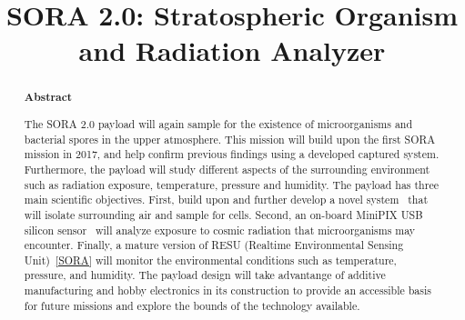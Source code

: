 \documentclass[aps,superscriptaddress,floatfix,nofootinbib,showpacs,amsmath,amssymb,altaffilletter,floatfix,onecolumn]{revtex4-1}
\begin{document}
\title{SORA 2.0: Stratospheric Organism and Radiation Analyzer}

\begin{abstract}
\begin{center}
{\bf Abstract}
\end{center}

The SORA 2.0 payload will again sample for the existence of microorganisms and bacterial spores in the upper atmosphere.  This mission will build upon the first SORA mission in 2017, and help confirm previous findings using a developed captured system. Furthermore, the payload will study different aspects of the surrounding environment such as radiation exposure, temperature, pressure and humidity. The payload has three main scientific objectives. First, build upon and further develop a novel system~\cite{SORA} that will isolate surrounding air and sample for cells. Second, an on-board MiniPIX USB silicon sensor~\cite{silicon_sensor} will analyze exposure to cosmic radiation that microorganisms may encounter. Finally, a mature version of RESU (Realtime Environmental Sensing Unit)~\ref{SORA} will monitor the environmental conditions such as temperature, pressure, and humidity. The payload design will take advantange of additive manufacturing and hobby electronics in its construction to provide an accessible basis for future missions and explore the bounds of the technology available.  

\newpage %
\end{abstract}

\setlength{\parindent}{1em}
\setdefaultleftmargin{1em}{1em}{}{}{}{}
\setcounter{page}{0}\thispagestyle{empty}
\maketitle
\onecolumngrid
\setcounter{tocdepth}{2}
\setcounter{page}{0}\thispagestyle{empty}
\tableofcontents
\setcounter{page}{0}\thispagestyle{empty}
\newpage
\onecolumngrid %


	
		
		

		
		
		
		
		
		
		
		
		
		
	
\end{document}
